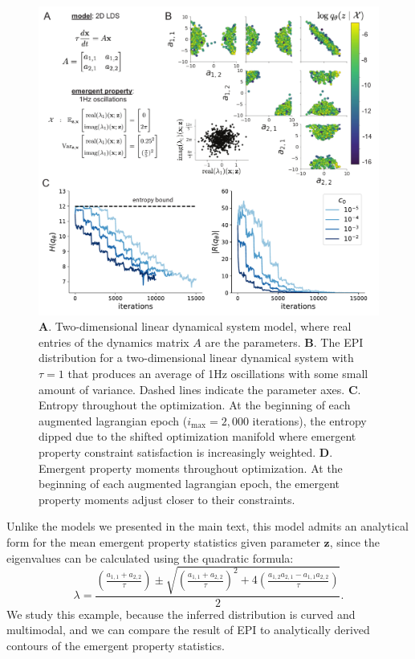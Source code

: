 \documentclass[11pt]{article}
\begin{document}
\begin{figure}
\begin{center}
\includegraphics[scale=0.8]{figures/figLDS1/figLDS1.pdf}
\end{center}
\caption{\textbf{A}. Two-dimensional linear dynamical system model, where real entries of the dynamics matrix $A$ are the parameters.  
\textbf{B}. The EPI distribution for a two-dimensional linear dynamical system with $\tau=1$ that produces an average of 1Hz oscillations with some small amount of variance.  Dashed lines indicate the parameter axes. 
\textbf{C}. Entropy throughout the optimization.  
At the beginning of each augmented lagrangian epoch ($i_{\text{max}} = 2,000$ iterations), the entropy dipped due to the shifted optimization manifold where emergent property constraint satisfaction is increasingly weighted.  
\textbf{D}. Emergent property moments throughout optimization.  
At the beginning of each augmented lagrangian epoch, the emergent property moments adjust closer to their constraints.}
\label{fig:LDS1}
\end{figure}

Unlike the models we presented in the main text, this model admits an analytical form for the mean emergent property statistics given parameter $\mathbf{z}$, since the eigenvalues can be calculated using the quadratic formula: 
\begin{equation}
\lambda = \frac{(\frac{a_{1,1} + a_{2,2}}{\tau}) \pm \sqrt{(\frac{a_{1,1}+a_{2,2}}{\tau})^2 + 4(\frac{a_{1,2} a_{2,1} - a_{1,1} a_{2,2}}{\tau})}}{2}.
\end{equation}
We study this example, because the inferred distribution is curved and multimodal, and we can compare the result of EPI to analytically derived contours of the emergent property statistics.
\end{document}

